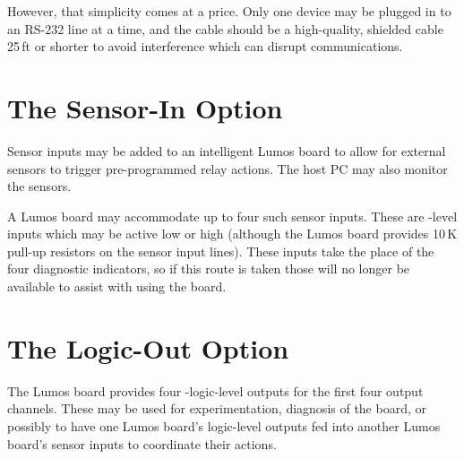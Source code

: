 \documentclass[letterpaper,twoside,onecolumn,openright,final]{memoir}
\begin{document}
However, that simplicity comes at a price.  Only one device may be plugged in to an RS-232 line
at a time, and the cable should be a high-quality, shielded cable 25\,ft or shorter to avoid
interference which can disrupt communications.

\section{The Sensor-In Option}
Sensor inputs  may be added to an intelligent Lumos board to allow for external
sensors to trigger pre-programmed relay actions.  The host PC may also monitor the
sensors.

A Lumos board may accommodate up to four such sensor inputs.  These are -level inputs
which may be active low or high (although the Lumos board provides 10\,K pull-up resistors on the
sensor input lines).  These inputs take the place of the four diagnostic  indicators,
so if this route is taken those will no longer be available to assist with using the board.

\section{The Logic-Out Option}
The Lumos board provides four -logic-level outputs  
for the first four output channels.  These may be used for experimentation, diagnosis of the board,
or possibly to have one Lumos board's logic-level outputs fed into another Lumos board's sensor inputs
to coordinate their actions.
\end{document}
